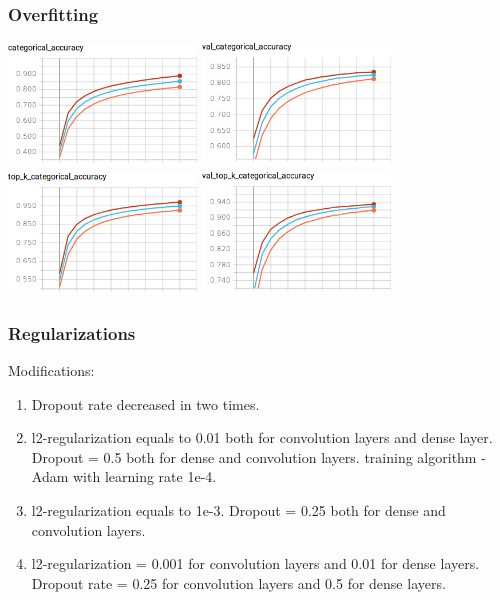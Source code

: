 \documentclass[14pt]{beamer}
\begin{document}
		\begin{frame}
			\frametitle{Overfitting}
			\hfil\hfil\includegraphics[width=5cm]{part4//3CNN_train_category_accuracy}
			\hfil\hfil\includegraphics[width=5cm]{part4//3CNN_val_category_accuracy}\newline
			\vfil
			\hfil\hfil\includegraphics[width=5cm]{part4/3CNN_train_top_k_accuracy}
			\hfil\hfil\includegraphics[width=5cm]{part4/3CNN_val_top_k_accuracy}\newline
		\end{frame}
		
		
	\begin{frame}
		\frametitle{Regularizations}
		Modifications:
		\begin{enumerate}
			\item Dropout rate decreased in two times.
			\item l2-regularization equals to 0.01 both for convolution layers and dense layer. 
			Dropout = 0.5 both for dense and convolution layers. 
		    training algorithm - Adam with learning rate 1e-4. 
			\item l2-regularization equals to 1e-3. 
			Dropout = 0.25 both for dense and convolution layers. 
			\item l2-regularization =  0.001 for convolution layers and 0.01 for dense layers. 
			Dropout rate = 0.25 for convolution layers and 0.5 for dense layers.
		\end{enumerate}
	\end{frame}
			
\end{document}

